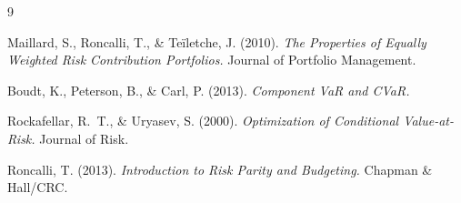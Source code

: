 \documentclass[11pt]{article}
\begin{document}
\begin{thebibliography}{9}

Maillard, S., Roncalli, T., \& Teïletche, J. (2010).
\emph{The Properties of Equally Weighted Risk Contribution Portfolios.}
Journal of Portfolio Management.

Boudt, K., Peterson, B., \& Carl, P. (2013).
\emph{Component VaR and CVaR.}

Rockafellar, R.~T., \& Uryasev, S. (2000).
\emph{Optimization of Conditional Value-at-Risk.}
Journal of Risk.

Roncalli, T. (2013).
\emph{Introduction to Risk Parity and Budgeting.}
Chapman \& Hall/CRC.

\end{thebibliography}
\end{document}
